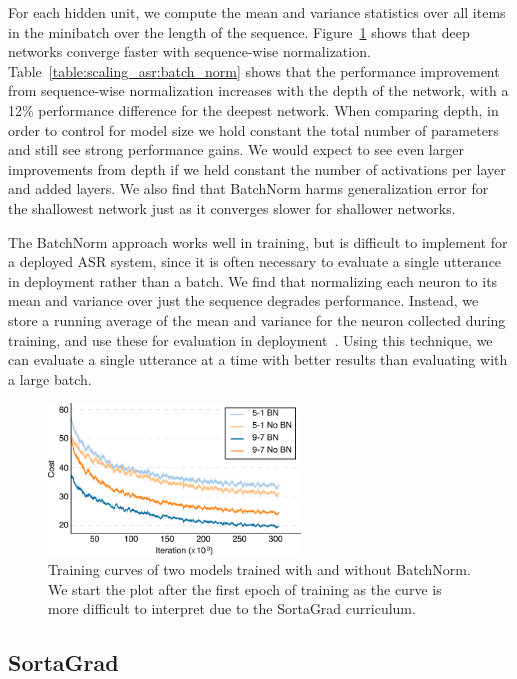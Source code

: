 For each hidden unit, we compute the mean and variance statistics over all
items in the minibatch over the length of the sequence.
Figure~\ref{fig:scaling_asr:bn} shows that deep networks converge faster with
sequence-wise normalization.  Table~\ref{table:scaling_asr:batch_norm} shows
that the performance improvement from sequence-wise normalization increases
with the depth of the network, with a 12\% performance difference for the
deepest network. When comparing depth, in order to control for model size we
hold constant the total number of parameters and still see strong performance
gains. We would expect to see even larger improvements from depth if we held
constant the number of activations per layer and added layers. We also find
that BatchNorm harms generalization error for the shallowest network just as it
converges slower for shallower networks. 

The BatchNorm approach works well in training, but is difficult to implement
for a deployed ASR system, since it is often necessary to evaluate a single
utterance in deployment rather than a batch. We find that normalizing each
neuron to its mean and variance over just the sequence degrades performance.
Instead, we store a running average of the mean and variance for the neuron
collected during training, and use these for evaluation in
deployment~\cite{ioffe2015batch}. Using this technique, we can evaluate a
single utterance at a time with better results than evaluating with a large
batch.

\begin{figure}
\centering
\includegraphics[width=0.6\textwidth]{scaling_asr/figures/bn_nobn.pdf}
\caption{Training curves of two models trained with and without BatchNorm. We
         start the plot after the first epoch of training as the curve is more
         difficult to interpret due to the SortaGrad curriculum.}
\label{fig:scaling_asr:bn}
\end{figure}

\subsection{SortaGrad}

